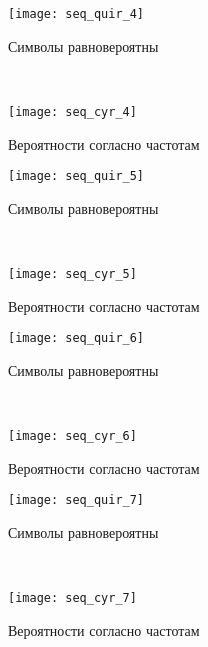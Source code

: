 \begin{figure}[H]
\begin{center}
	\begin{subfigure}[b]{0.45\textwidth}
		\texttt{[image: seq\_quir\_4]}
		\caption{Символы равновероятны}
	\end{subfigure}
	~
	\begin{subfigure}[b]{0.45\textwidth}
		\texttt{[image: seq\_cyr\_4]}
		\caption{Вероятности согласно частотам}
	\end{subfigure}
	\caption{}
\end{center}
\end{figure}

\begin{figure}[H]
\begin{center}
	\begin{subfigure}[b]{0.45\textwidth}
		\texttt{[image: seq\_quir\_5]}
		\caption{Символы равновероятны}
	\end{subfigure}
	~
	\begin{subfigure}[b]{0.45\textwidth}
		\texttt{[image: seq\_cyr\_5]}
		\caption{Вероятности согласно частотам}
	\end{subfigure}
	\caption{}
\end{center}
\end{figure}

\begin{figure}[H]
\begin{center}
	\begin{subfigure}[b]{0.45\textwidth}
		\texttt{[image: seq\_quir\_6]}
		\caption{Символы равновероятны}
	\end{subfigure}
	~
	\begin{subfigure}[b]{0.45\textwidth}
		\texttt{[image: seq\_cyr\_6]}
		\caption{Вероятности согласно частотам}
	\end{subfigure}
	\caption{}
\end{center}
\end{figure}

\begin{figure}[H]
\begin{center}
	\begin{subfigure}[b]{0.45\textwidth}
		\texttt{[image: seq\_quir\_7]}
		\caption{Символы равновероятны}
	\end{subfigure}
	~
	\begin{subfigure}[b]{0.45\textwidth}
		\texttt{[image: seq\_cyr\_7]}
		\caption{Вероятности согласно частотам}
	\end{subfigure}
	\caption{}
\end{center}
\end{figure}

